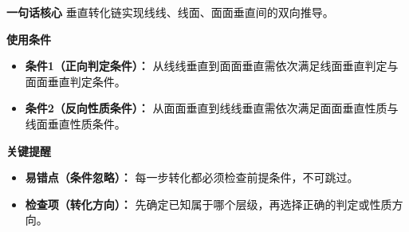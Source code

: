 \begin{summarybox}
	\textbf{\textcolor{CSummary}{一句话核心}}
	垂直转化链实现线线、线面、面面垂直间的双向推导。

	\medskip
	\textbf{\textcolor{CSummary}{使用条件}}
	\begin{itemize}[leftmargin=*, itemsep=0.5em, topsep=0.4em]
		\item \textbf{条件1（正向判定条件）：} 从线线垂直到面面垂直需依次满足线面垂直判定与面面垂直判定条件。
		\item \textbf{条件2（反向性质条件）：} 从面面垂直到线线垂直需依次满足面面垂直性质与线面垂直性质条件。
	\end{itemize}

	\medskip
	\textbf{\textcolor{CSummary}{关键提醒}}
	\begin{itemize}[leftmargin=*, itemsep=0.5em, topsep=0.4em]
		\item \textbf{易错点（条件忽略）：} 每一步转化都必须检查前提条件，不可跳过。
		\item \textbf{检查项（转化方向）：} 先确定已知属于哪个层级，再选择正确的判定或性质方向。
	\end{itemize}

\end{summarybox}

